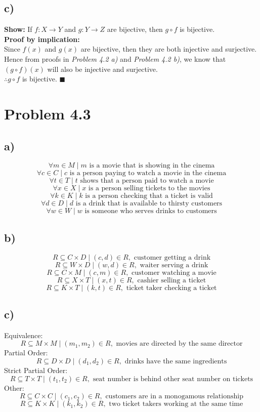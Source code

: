 \documentclass{article}
\begin{document}
\subsection*{c)}
\textbf{Show:} If $f: X \rightarrow Y$ and $g:Y \rightarrow Z$ are bijective, then
$g \circ f$ is bijective. \\
\textbf{Proof by implication:} \\
Since $f(x)$ and $g(x)$ are bijective, then they are both injective and surjective. \\
Hence from proofs in \textit{Problem 4.2 a)} and \textit{Problem 4.2 b)}, we know that
$(g \circ f)(x)$ will also be injective and surjective. \\
$\therefore g \circ f$ is bijective. $\blacksquare$ \\

\section*{Problem 4.3}
\subsection*{a)}
\[
    \forall m \in M \mid m \text{ is a movie that is showing in the cinema}
\]
\[
    \forall c \in C \mid c \text{ is a person paying to watch a movie in the cinema}
\]
\[
    \forall t \in T \mid t \text{ shows that a person paid to watch a movie}
\]
\[
    \forall x \in X \mid x \text{ is a person selling tickets to the movies}
\]
\[
    \forall k \in K \mid k \text{ is a person checking that a ticket is valid}
\]
\[
    \forall d \in D \mid d \text{ is a drink that is available to thirsty customers}
\]
\[
    \forall w \in W \mid w \text{ is someone who serves drinks to customers}
\]

\subsection*{b)}
\[
    R \subseteq C \times D \mid (c, d) \in R, \text{ customer getting a drink}
\]
\[
    R \subseteq W \times D \mid (w, d) \in R, \text{ waiter serving a drink}
\]
\[
    R \subseteq C \times M \mid (c, m) \in R, \text{ customer watching a movie}
\]
\[
    R \subseteq X \times T \mid (x, t) \in R, \text{ cashier selling a ticket}
\]
\[
    R \subseteq K \times T \mid (k, t) \in R, \text{ ticket taker checking a ticket}
\]

\subsection*{c)}
Equivalence:
\[
    R \subseteq M \times M \mid (m_1, m_2) \in R, \text{ movies are directed by the same director}
\]
Partial Order:
\[
    R \subseteq D \times D \mid (d_1, d_2) \in R, \text{ drinks have the same ingredients}
\]
Strict Partial Order:
\[
    R \subseteq T \times T \mid (t_1, t_2) \in R, \text{ seat number is behind other seat number on tickets}
\]
Other:
\[
    R \subseteq C \times C \mid (c_1, c_2) \in R, \text{ customers are in a monogamous relationship}
\]
\[
    R \subseteq K \times K \mid (k_1, k_2) \in R, \text{ two ticket takers working at the same time}
\]
\end{document}
